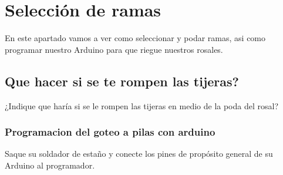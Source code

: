 \documentclass[12pt,a4paper]{article}
\begin{document}
\makeexamheader

\section{Selección de ramas}

En este apartado vamos a ver como seleccionar y podar ramas, asi como programar nuestro Arduino para que riegue nuestros rosales.

\subsection{Que hacer si se te rompen las tijeras?}
¿Indique que haría si se le rompen las tijeras en medio de la poda del rosal?


\subsubsection{Programacion del goteo a pilas con arduino}

Saque su soldador de estaño y conecte los pines de propósito general de su Arduino al programador.
\end{document}
